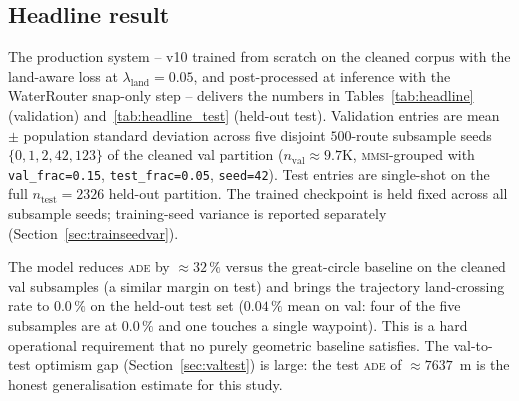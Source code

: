 \documentclass[oneside, a4paper, onecolumn, 11pt]{article}
\newcommand{\ade}{\textsc{ade}}
\newcommand{\fde}{\textsc{fde}}
\begin{document}
\subsection{Headline result}

The production system -- v10 trained from scratch on the cleaned
corpus with the land-aware loss at
$\lambda_{\mathrm{land}} = 0.05$, and post-processed at inference with
the WaterRouter snap-only step -- delivers the numbers in
Tables~\ref{tab:headline} (validation) and~\ref{tab:headline_test}
(held-out test).
Validation entries are mean $\pm$ population standard deviation across
five disjoint $500$-route subsample seeds
$\{0, 1, 2, 42, 123\}$ of the cleaned val partition
($n_{\text{val}} \approx 9.7\text{K}$, \textsc{mmsi}-grouped with
\texttt{val\_frac=0.15}, \texttt{test\_frac=0.05}, \texttt{seed=42}).
Test entries are single-shot on the full $n_{\text{test}} = 2326$
held-out partition.  The trained checkpoint is held fixed across all
subsample seeds; training-seed variance is reported separately
(Section~\ref{sec:trainseedvar}).

\begin{table}[h]
\centering
\caption{Headline performance on the cleaned \emph{validation} set
(5-seed mean $\pm$ std on disjoint 500-route subsamples).
Lower is better for \ade{} and cross\%; \fde{} is uninformative for
endpoint-correct methods.}
\label{tab:headline}

\end{table}

\begin{table}[h]
\centering
\caption{Headline performance on the fully held-out cleaned \emph{test}
set ($n = 2326$, single shot, no \textsc{mmsi} overlap with train or
val). Test ADE is consistently $\approx 30\,\%$ above val ADE
across all methods (Section~\ref{sec:valtest}).}
\label{tab:headline_test}

\end{table}

The model reduces \ade{} by $\approx 32\,\%$ versus the great-circle
baseline on the cleaned val subsamples (a similar margin on test) and
brings the trajectory land-crossing rate to $0.0\,\%$ on the held-out
test set ($0.04\,\%$ mean on val: four of the five subsamples are at
$0.0\,\%$ and one touches a single waypoint).  This is a hard
operational requirement that no purely geometric baseline satisfies.
The val-to-test optimism gap (Section~\ref{sec:valtest}) is large:
the test \ade{} of $\approx 7637$~m is the honest generalisation
estimate for this study.
\end{document}
